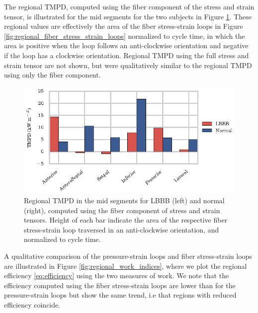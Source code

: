 The regional TMPD, computed using the fiber
component of the stress and strain tensor, is illustrated for the mid
segments for the two subjects in Figure
\ref{fig:regional_power_density}. These regional values are
effectively the area of the fiber stress-strain loops in Figure
\ref{fig:regional_fiber_stress_strain_loops} normalized to cycle
time, in which the area is positive when the loop follows an
anti-clockwise orientation and negative if the loop has a clockwise
orientation. Regional TMPD using the full stress and strain tensor are
not shown, but were qualitatively similar to the regional TMPD using
only the fiber component.


\begin{figure}[htbp]
  \centering
  \includegraphics{figures/regional_power_density}
  \caption{\label{fig:regional_power_density} Regional TMPD in the mid
    segments for LBBB (left) and normal (right), computed using the
    fiber component of stress and strain tensors. Height of each bar
    indicate the area of the respective fiber stress-strain loop
    traversed in an anti-clockwise orientation, and normalized to
    cycle time.}  
\end{figure}

A qualitative comparison of the pressure-strain loops and fiber
stress-strain loops are illustrated in Figure
\ref{fig:regional_work_indices}, where we plot the regional efficiency
\eqref{eq:efficiency} using the two measures of work. We note that the
efficiency computed using the fiber stress-strain loops are
lower than for the pressure-strain loops but show the same trend, i.e
that regions with reduced efficiency coincide.  

